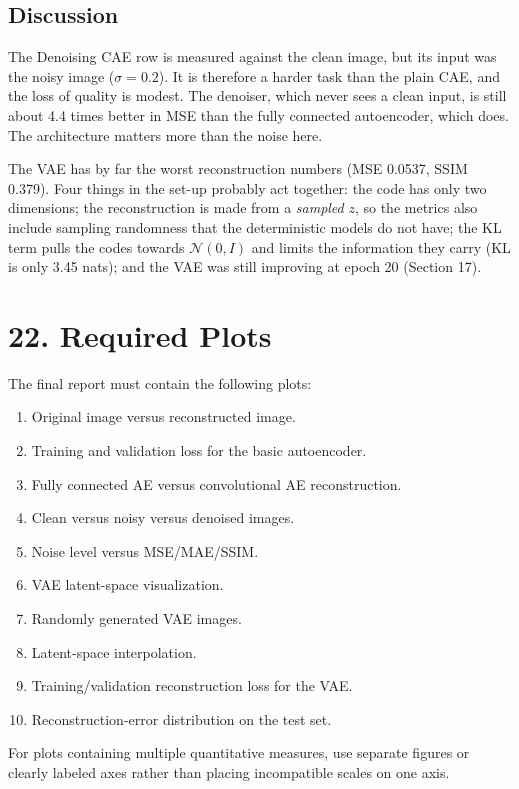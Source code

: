 \documentclass[10pt]{article}
\begin{document}
\subsection*{Discussion}

The Denoising CAE row is measured against the clean image, but its input was the
noisy image ($\sigma=0.2$). It is therefore a harder task than the plain CAE,
and the loss of quality
is modest. The denoiser, which never sees a clean input, is still about 4.4
times better in MSE than the fully connected autoencoder, which does. The
architecture matters more than the noise here.

The VAE has by far the worst reconstruction numbers (MSE 0.0537, SSIM 0.379).
Four things in the set-up probably act together: the code has only two dimensions; the reconstruction is made from a \emph{sampled} $z$, so the
metrics also include sampling randomness that the deterministic models do not
have; the KL term pulls the codes towards $\mathcal{N}(0,I)$ and limits the
information they carry (KL is only 3.45 nats); and the VAE was still improving at
epoch 20 (Section 17).

\section*{22. Required Plots}

The final report must contain the following plots:

\begin{enumerate}
\item Original image versus reconstructed image.
\item Training and validation loss for the basic autoencoder.
\item Fully connected AE versus convolutional AE reconstruction.
\item Clean versus noisy versus denoised images.
\item Noise level versus MSE/MAE/SSIM.
\item VAE latent-space visualization.
\item Randomly generated VAE images.
\item Latent-space interpolation.
\item Training/validation reconstruction loss for the VAE.
\item Reconstruction-error distribution on the test set.
\end{enumerate}

For plots containing multiple quantitative measures, use separate figures or
clearly labeled axes rather than placing incompatible scales on one axis.
\end{document}
